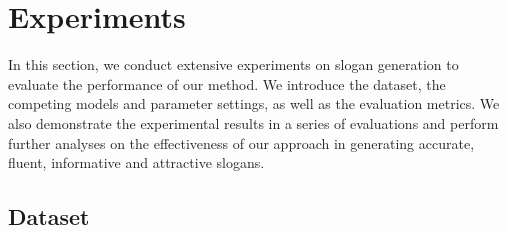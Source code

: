 \section{Experiments}
\label{sec:experiments}
In this section, we conduct
extensive experiments on slogan generation 
to evaluate the performance
of our method.
We introduce the dataset, 
the competing models and parameter settings,
as well as the evaluation metrics.
We also demonstrate the experimental results in a series of evaluations
and perform further analyses on the effectiveness of our approach
in generating accurate, fluent, informative and attractive slogans.

\subsection{Dataset}
\label{sec:dataset}

